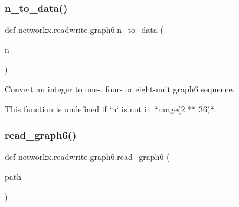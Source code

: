 \subsubsection{\texorpdfstring{n\+\_\+to\+\_\+data()}{n\_to\_data()}}
{\footnotesize\ttfamily def networkx.\+readwrite.\+graph6.\+n\+\_\+to\+\_\+data (\begin{DoxyParamCaption}\item[{}]{n }\end{DoxyParamCaption})}

\begin{DoxyVerb}Convert an integer to one-, four- or eight-unit graph6 sequence.

This function is undefined if `n` is not in ``range(2 ** 36)``.\end{DoxyVerb}
 \mbox{\label{namespacenetworkx_1_1readwrite_1_1graph6_a9027ab628428ffc2a9e2896c8308db1b}} 
\subsubsection{\texorpdfstring{read\+\_\+graph6()}{read\_graph6()}}
{\footnotesize\ttfamily def networkx.\+readwrite.\+graph6.\+read\+\_\+graph6 (\begin{DoxyParamCaption}\item[{}]{path }\end{DoxyParamCaption})}


